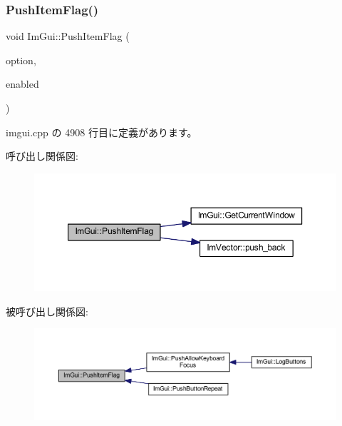 \subsubsection{\texorpdfstring{Push\+Item\+Flag()}{PushItemFlag()}}
{\footnotesize\ttfamily void Im\+Gui\+::\+Push\+Item\+Flag (\begin{DoxyParamCaption}\item[{\mbox{\hyperlink{imgui__internal_8h_abcf9eafab4557e911b2c0d8fe2feeb38}{Im\+Gui\+Item\+Flags}}}]{option,  }\item[{bool}]{enabled }\end{DoxyParamCaption})}



 imgui.\+cpp の 4908 行目に定義があります。

呼び出し関係図\+:\nopagebreak
\begin{figure}[H]
\begin{center}
\leavevmode
\includegraphics[width=350pt]{namespace_im_gui_ac7301f6378333f6d17f47823eed9e00a_cgraph}
\end{center}
\end{figure}
被呼び出し関係図\+:\nopagebreak
\begin{figure}[H]
\begin{center}
\leavevmode
\includegraphics[width=350pt]{namespace_im_gui_ac7301f6378333f6d17f47823eed9e00a_icgraph}
\end{center}
\end{figure}
\mbox{\label{namespace_im_gui_a4ad13bf38f0521a339133248ef3e3036}} 
